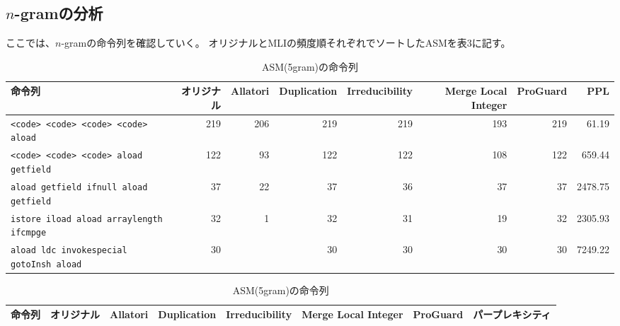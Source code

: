 \documentclass[a4j,fleqn,10pt]{jarticle}
\begin{document}
\subsection{$n$-gramの分析}

ここでは、$n$-gramの命令列を確認していく。
オリジナルとMLIの頻度順それぞれでソートしたASMを表3に記す。

\begin{table}[t]
  \centering
  \footnotesize{
    \caption{ASM(5gram)の命令列}\label{table:asm}
  \begin{tabular}{lrrrrrrr}
    命令列 &
    \multicolumn{1}{p{1cm}}{オリジナル} & 
    \multicolumn{1}{p{1cm}}{Allatori} & 
    \multicolumn{1}{p{1cm}}{Duplication} & 
    \multicolumn{1}{p{1cm}}{Irreducibility} & 
    \multicolumn{1}{p{1cm}}{Merge Local Integer} & 
    \multicolumn{1}{p{1cm}}{ProGuard} & 
    \multicolumn{1}{p{1cm}}{PPL} \\ \hline
    \texttt{<code> <code> <code> <code> aload}      & 219 & 206 & 219 & 219 & 193 & 219 & 61.19 \\
    \texttt{<code> <code> <code> aload getfield}    & 122 &  93 & 122 & 122 & 108 & 122 & 659.44 \\
    \texttt{aload getfield ifnull aload getfield}   & 37  &  22 &  37 &  36 &  37 &  37 & 2478.75 \\
    \texttt{istore iload aload arraylength ifcmpge} & 32  &   1 &  32 &  31 &  19 &  32 & 2305.93 \\
    \texttt{aload ldc invokespecial gotoInsh aload} & 30  &     &  30 &  30 &  30 &  30 & 7249.22 \\
  \end{tabular}
  \begin{tabular}{lrrrrrrr}
    命令列 &
    \multicolumn{1}{p{1cm}}{オリジナル} & 
    \multicolumn{1}{p{1cm}}{Allatori} & 
    \multicolumn{1}{p{1cm}}{Duplication} & 
    \multicolumn{1}{p{1cm}}{Irreducibility} & 
    \multicolumn{1}{p{1cm}}{Merge Local Integer} & 
    \multicolumn{1}{p{1cm}}{ProGuard} & 
    \multicolumn{1}{p{1cm}}{パープレキシティ} \\ \hline

\end{tabular}}
\end{table}
\end{document}
